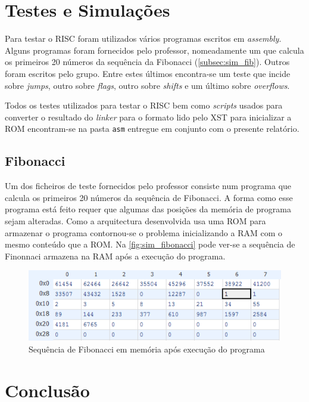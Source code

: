 \documentclass[a4paper]{article}
\begin{document}
	\section{Testes e Simulações}
	
		Para testar o \textmu RISC foram utilizados vários programas escritos em \textit{assembly}. Alguns programas foram fornecidos pelo professor, nomeadamente um que calcula os primeiros 20 números da sequência da Fibonacci (\autoref{subsec:sim_fib}). Outros foram escritos pelo grupo. Entre estes últimos encontra-se um teste que incide sobre \textit{jumps}, outro sobre \textit{flags}, outro sobre \textit{shifts} e um último sobre \textit{overflows}.
		
		Todos os testes utilizados para testar o \textmu RISC bem como \textit{scripts} usados para converter o resultado do \textit{linker} para o formato lido pelo XST para inicializar a ROM encontram-se na pasta \texttt{asm} entregue em conjunto com o presente relatório.
	
		\subsection{Fibonacci}
		\label{subsec:sim_fib}
		
			Um dos ficheiros de teste fornecidos pelo professor consiste num programa que calcula os primeiros 20 números da sequência de Fibonacci. A forma como esse programa está feito requer que algumas das posições da memória de programa sejam alteradas. Como a arquitectura desenvolvida usa uma ROM para armazenar o programa contornou-se o problema inicializando a RAM com o mesmo conteúdo que a ROM. Na \autoref{fig:sim_fibonacci} pode ver-se a sequência de Finonnaci armazena na RAM após a execução do programa.
			
			\begin{figure}[H]
				\centering
				\includegraphics[width=\textwidth]{img/sim_fibonacci}
				\caption{Sequência de Fibonacci em memória após execução do programa}
				\label{fig:sim_fibonacci}
			\end{figure}

		
	\section{Conclusão}
\end{document}
